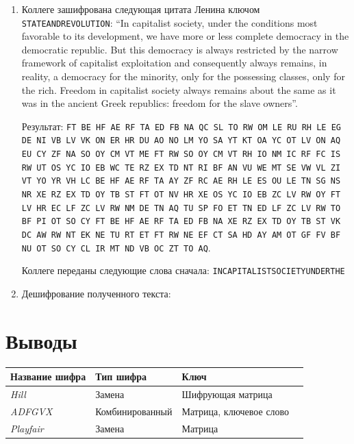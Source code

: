 \documentclass[a4paper, 14pt]{extarticle}
\begin{document}
\begin{enumerate}
    \item Коллеге зашифрована следующая цитата Ленина ключом \texttt{STATEANDREVOLUTION}: ``In capitalist society, under the conditions most favorable to its development, we have more or less complete democracy in the democratic republic. But this democracy is always restricted by the narrow framework of capitalist exploitation and consequently always remains, in reality, a democracy for the minority, only for the possessing classes, only for the rich. Freedom in capitalist society always remains about the same as it was in the ancient Greek republics: freedom for the slave owners''.

    Результат: \texttt{FT BE HF AE RF TA ED FB NA QC SL TO RW OM LE RU RH LE EG DE NI VB LV VK ON ER HR DU AO NO LM YO SA YT KT OA YC OT LV ON AQ EU CY ZF NA SO OY CM VT ME FT RW SO OY CM VT RH IO NM IC RF FC IS RW UT OS YC IO EB WC TE RZ EX TD NT RI BF AN VU WE MT SE VW VL ZI VT YO YR VH LC BE HF AE RF TA AY ZF RC AE RH LE ES OU LE TN SG NS NR XE RZ EX TD OY TB ST FT OT NV HR XE OS YC IO EB ZC LV RW OY FT LV HR EC LF ZC LV RW NM DE TN AQ TU SP FO ET TN ED LF ZC LV RW TO BF PI OT SO CY FT BE HF AE RF TA ED FB NA XE RZ EX TD OY TB ST VK DC AW RW NT EK NE TU RT ET FT RW NE EF CT SA HD AY AM OT GF FV BF NU OT SO CY CL IR MT ND VB OC ZT TO AQ}.

    Коллеге переданы следующие слова сначала: \texttt{INCAPITALISTSOCIETYUNDERTHE} 

    \item Дешифрование полученного текста:

    \lipsum[1] %

\end{enumerate}

\newpage
\section*{Выводы}
\begin{table}[h]
    \begin{tabularx}{\textwidth}{@{}XXXX@{}}
    \toprule
    \textbf{Название шифра} & \textbf{Тип шифра} & \textbf{Ключ} \\ \midrule
    \textit{Hill} & Замена & Шифрующая матрица \\
    \textit{ADFGVX} & Комбинированный & Матрица, ключевое слово \\
    \textit{Playfair} & Замена & Матрица \\ \bottomrule
    \end{tabularx}
\end{table}
\end{document}
